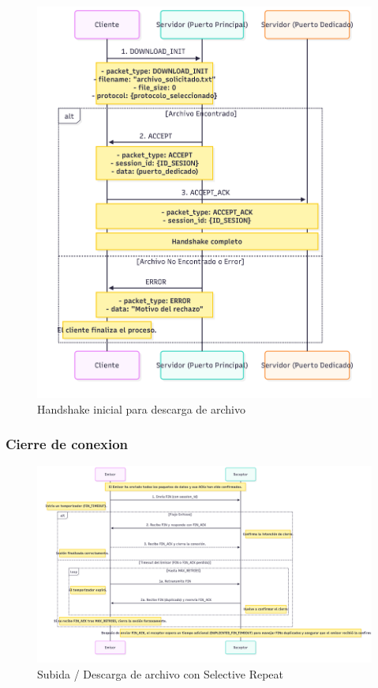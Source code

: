 \begin{figure}[H]
    \centering
    \includegraphics[width=1\linewidth]{images/DOWNLOAD_HANDSHAKE}
    \caption{Handshake inicial para descarga de archivo}
    \label{fig:placeholder}
\end{figure}

\subsubsection{Cierre de conexion}

\begin{figure}[H]
    \centering
    \includegraphics[width=1\linewidth]{images/FIN}
    \caption{Subida / Descarga de archivo con Selective Repeat}
    \label{fig:placeholder}
\end{figure}

